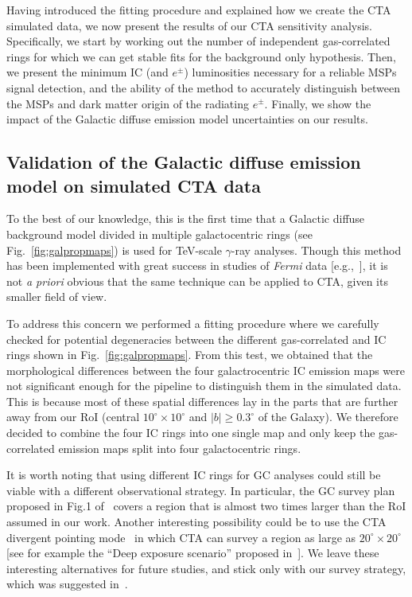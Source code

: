 \documentclass[doublespace,nopageskip]{VTthesis} %
\begin{document}
Having introduced the fitting procedure and explained how we create the CTA simulated data, we now present the results of our CTA sensitivity analysis.
Specifically, we start by working out the number of independent gas-correlated rings for which we can get stable fits for the background only hypothesis. Then, we present the minimum IC (and $e^\pm$) luminosities necessary for a reliable MSPs signal detection, and the ability of the method to accurately distinguish between the MSPs and dark matter origin of the radiating $e^\pm$. Finally, we show the impact of the Galactic diffuse emission model uncertainties on our results.

\subsection{Validation of the Galactic diffuse emission model on simulated CTA data}
\label{subsec:validationGDE}

To the best of our knowledge, this is the first time that a Galactic diffuse background model divided in multiple galactocentric rings (see Fig.~\ref{fig:galpropmaps}) is used for TeV-scale $\gamma$-ray analyses. Though this method has been implemented with great success in studies of \textit{Fermi} data [e.g.,~\citet{Fermi-LAT:4FGL}], it is not {\it a priori} obvious that the same technique can be applied to CTA, given its smaller field of view.

To address this concern
we performed a fitting procedure where we carefully checked for potential degeneracies between the different gas-correlated and IC rings shown in Fig.~\ref{fig:galpropmaps}. From this test, we obtained that the morphological differences between the four galactrocentric IC emission maps were not significant enough for the pipeline to distinguish them in the simulated data. This is because most of these spatial differences lay in the parts that are further away from our RoI (central $10^\circ\times10^\circ$ and $|b|\geq0.3^\circ$ of the Galaxy). We therefore decided to
combine the four IC rings into one single map and only keep the gas-correlated emission
maps split into four galactocentric rings.

It is worth noting that using different IC rings for GC analyses could still be viable with a different observational strategy. In particular, the GC survey plan proposed in Fig.1 of~\citet{Acharyya:2020sbj} covers a region that is almost two times larger than the RoI assumed in our work. Another interesting possibility could be to use the CTA divergent pointing mode~\citep{Gerard:2015gge} in which CTA can survey a region as large as $20^\circ \times 20^\circ$ [see for example the ``Deep exposure scenario'' proposed in~\cite{Coronado-Blazquez:2021avx}]. We leave these interesting alternatives for future studies, and stick only with our survey strategy, which was suggested in~\citet{Rinchiuso:2020skh}. 
\end{document}
